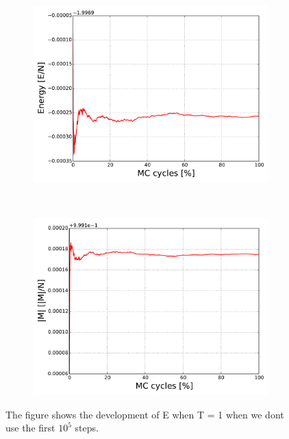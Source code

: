 \begin{figure}[H]
    \centering
    \begin{subfigure}{0.5\textwidth}
        \centering
        \includegraphics[width=\linewidth]{result/bilder/20x20/E-N20-T1-Term}
        \caption{}
    \end{subfigure}%
    ~ 
    \begin{subfigure}{0.5\textwidth}
        \centering
        \includegraphics[width=\linewidth]{result/bilder/20x20/M-N20-T1-Term}
        \caption{}
    \end{subfigure}
    \caption{The figure shows the development of E when T = 1 when we dont use the first $10^5$ steps.  }
    \label{fig:equilibrium}
\end{figure}

